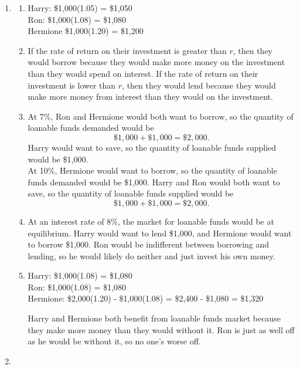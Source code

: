 \documentclass{article}
\begin{document}
\begin{enumerate}
\begin{enumerate}
	\end{enumerate}
	
\item

	\begin{enumerate}
	
	\item Harry: \$1,000(1.05) = \$1,050 \\
		Ron: \$1,000(1.08) = \$1,080 \\
		Hermione \$1,000(1.20) = \$1,200
		
	\item If the rate of return on their investment is greater than $r$, then they would borrow because they would make more money on the investment than they would spend on interest. If the rate of return on their investment is lower than $r$, then they would lend because they would make more money from interest than they would on the investment.
	
	\item At 7\%, Ron and Hermione would both want to borrow, so the quantity of loanable funds demanded would be \[ \$1,000 + \$1,000 = \$2,000. \] Harry would want to save, so the quantity of loanable funds supplied would be \$1,000. \\
	At 10\%, Hermione would want to borrow, so the quantity of loanable funds demanded would be \$1,000. Harry and Ron would both want to save, so the quantity of loanable funds supplied would be \[\$1,000 + \$1,000 = \$2,000. \]
	
	\item At an interest rate of 8\%, the market for loanable funds would be at equilibrium. Harry would want to lend \$1,000, and Hermione would want to borrow \$1,000. Ron would be indifferent between borrowing and lending, so he would likely do neither and just invest his own money. 
	
	\item Harry: \$1,000(1.08) = \$1,080 \\
		Ron: \$1,000(1.08) = \$1,080 \\
		Hermione: \$2,000(1.20) - \$1,000(1.08) = \$2,400 - \$1,080 = \$1,320
		
		Harry and Hermione both benefit from loanable funds market because they make more money than they would without it. Ron is just as well off as he would be  without it, so no one's worse off.
	
	\end{enumerate}
	
\item


\end{enumerate}
\end{document}
